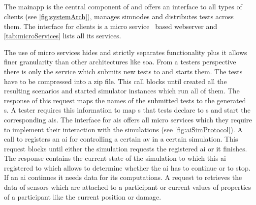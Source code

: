 \subsection{\texorpdfstring{}{MainApp}}
The \gls{mainapp} is the central component of \drivebuild{} and offers an interface to all types of clients (see \cref{fig:systemArch}), manages \glspl{simnode} and distributes tests across them.
The interface for clients is a micro service~\cite{microServices} based webserver and \cref{tab:microServices} lists all its services.
\begin{table}
    \centering
    \caption{%
         micro services --- Lists the micro services which the \gls{mainapp} provides, a short description, the required parameters and the return type in case a request is successful.
        All parameters have to be appended to an  as GET parameters except for underlined parameters which have to be sent as the content of a POST request.
        Italic entries add notes about parameters.
    }\label{tab:microServices}
    \medskip
    
\end{table}
The use of micro services hides and strictly separates functionality plus it allows finer granularity than other architectures like \gls{soa}.
From a testers perspective there is only the service  which submits new tests to \drivebuild{} and starts them.
The tests have to be compressed into a zip file.
This call blocks until \drivebuild{} created all the resulting scenarios and started simulator instances which run all of them.
The response of this request maps the names of the submitted tests to the generated \unskip{}s.
A tester requires this information to map \unskip{}s that tests declare to \unskip{}s and start the corresponding \glspl{ai}.
The interface for \glspl{ai} offers all micro services which they require to implement their interaction with the simulations (see \cref{fig:aiSimProtocol}).
A call to  registers an \gls{ai} for controlling a certain \gls{av} in a certain simulation.
This request blocks until either the simulation requests the registered \gls{ai} or it finishes.
The response contains the current state of the simulation to which this \gls{ai} registered to which allows to determine whether the \gls{ai} has to continue or to stop.
If an \gls{ai} continues it needs data for its computations.
A request to  retrieves the data of sensors which are attached to a participant or current values of properties of a participant like the current position or damage.
